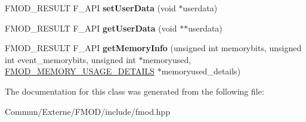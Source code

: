\begin{DoxyCompactItemize}
\item 
F\+M\+O\+D\+\_\+\+R\+E\+S\+U\+LT F\+\_\+\+A\+PI {\bfseries set\+User\+Data} (void $\ast$userdata)\hypertarget{class_f_m_o_d_1_1_d_s_p_connection_ab3d3a0dc61be71656ee5b1b5d7dab50d}{}\label{class_f_m_o_d_1_1_d_s_p_connection_ab3d3a0dc61be71656ee5b1b5d7dab50d}

\item 
F\+M\+O\+D\+\_\+\+R\+E\+S\+U\+LT F\+\_\+\+A\+PI {\bfseries get\+User\+Data} (void $\ast$$\ast$userdata)\hypertarget{class_f_m_o_d_1_1_d_s_p_connection_ad9db81fe98ee0eecb099a565d5ae2a4d}{}\label{class_f_m_o_d_1_1_d_s_p_connection_ad9db81fe98ee0eecb099a565d5ae2a4d}

\item 
F\+M\+O\+D\+\_\+\+R\+E\+S\+U\+LT F\+\_\+\+A\+PI {\bfseries get\+Memory\+Info} (unsigned int memorybits, unsigned int event\+\_\+memorybits, unsigned int $\ast$memoryused, \hyperlink{struct_f_m_o_d___m_e_m_o_r_y___u_s_a_g_e___d_e_t_a_i_l_s}{F\+M\+O\+D\+\_\+\+M\+E\+M\+O\+R\+Y\+\_\+\+U\+S\+A\+G\+E\+\_\+\+D\+E\+T\+A\+I\+LS} $\ast$memoryused\+\_\+details)\hypertarget{class_f_m_o_d_1_1_d_s_p_connection_aaaf64c05107a635984495b8f4ba8a8fd}{}\label{class_f_m_o_d_1_1_d_s_p_connection_aaaf64c05107a635984495b8f4ba8a8fd}

\end{DoxyCompactItemize}


The documentation for this class was generated from the following file\+:\begin{DoxyCompactItemize}
\item 
Commun/\+Externe/\+F\+M\+O\+D/include/fmod.\+hpp\end{DoxyCompactItemize}
